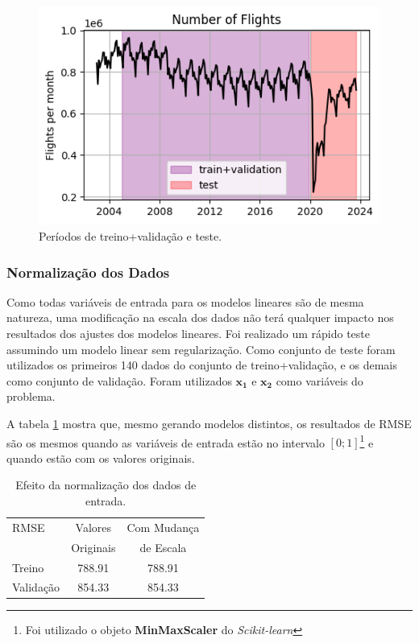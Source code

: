 \documentclass[final,5p]{elsarticle}
\numberwithin{equation}{section}
\begin{document}
    \begin{figure}[hbt!]
        \includegraphics[width=0.95\columnwidth]{B1_TrainTest.png}
        \caption{Períodos de treino+validação e teste.}
        \label{fig:treino_teste}
    \end{figure}

    \subsubsection{Normalização dos Dados}

    Como todas variáveis de entrada para os modelos lineares são de mesma natureza, uma modificação na escala dos dados não terá qualquer impacto nos resultados dos ajustes dos modelos lineares. Foi realizado um rápido teste assumindo um modelo linear sem regularização. Como conjunto de teste foram utilizados os primeiros 140 dados do conjunto de treino+validação, e os demais como conjunto de validação. Foram utilizados $\textbf{x}_{\textbf{1}}$ e $\textbf{x}_{\textbf{2}}$ como variáveis do problema.

    A tabela \ref{tab:efeito_mimmaxscaler} mostra que, mesmo gerando modelos distintos, os resultados de RMSE são os mesmos quando as variáveis de entrada estão no intervalo $[0;1]$\footnote{Foi utilizado o objeto \textbf{MinMaxScaler} do \emph{Scikit-learn}} e quando estão com os valores originais.

    \begin{table}[h]
        \centering
        \begin{tabular}{l c c}
        \hline
        RMSE & Valores & Com Mudança \\
         & Originais & de Escala \\
        \hline
        Treino & 788.91 & 788.91 \\
        Validação & 854.33 & 854.33 \\
        \hline
        \end{tabular}
        \caption{Efeito da normalização dos dados de entrada.}
        \label{tab:efeito_mimmaxscaler}
    \end{table}
\end{document}
